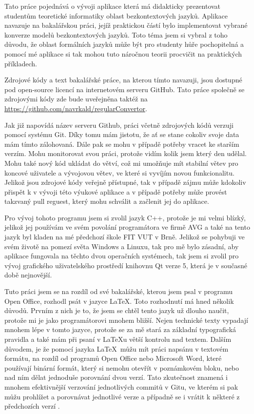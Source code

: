 
Tato práce pojednává o vývoji aplikace která má didakticky prezentovat studentům teoretické informatiky oblast bezkontextových jazyků. Aplikace navazuje na bakalářskou práci, jejíž praktickou částí bylo implementovat vybrané konverze modelů bezkontextových jazyků. Toto téma jsem si vybral z toho důvodu, že oblast formálních jazyků může být pro studenty hůře pochopitelná a pomocí mé aplikace si tak mohou tuto náročnou teorii procvičit na praktických příkladech.

Zdrojové kódy a text bakalářské práce, na kterou tímto navazuji, jsou dostupné pod open-source licencí na internetovém serveru GitHub. Tato práce společně se zdrojovými kódy zde bude uveřejněna taktéž na \url{https://github.com/navrkald/regularConvertor}.

Jak již napovídá název serveru Github, práci včetně zdrojových kódů verzuji pomocí systému Git. Díky tomu mám jistotu, že ať se stane cokoliv svoje data mám tímto zálohovaná. Dále pak se mohu v případě potřeby vracet ke starším verzím. Mohu monitorovat svou práci, protože vidím kolik jsem který den udělal. Mohu také nový kód ukládat do větví, což mi umožňuje mít stabilní větev pro koncové uživatele a vývojovou větev, ve které si vyvíjím novou funkcionalitu. Jelikož jsou zdrojové kódy veřejně přístupné, tak v případě zájmu může kdokoliv přispět k v vývoji této výukové aplikace a v případě potřeby může provést takzvaný pull reguest, který mohu schválit a začlenit jej do aplikace.

Pro vývoj tohoto programu jsem si zvolil jazyk C++, protože je mi velmi blízký, jelikož jej používám ve svém povolání programátora ve firmě AVG a také na tento jazyk byl kladen na mé předchozí škole FIT VUT v Brně. Jelikož se pohybuji ve svém životě na pomezí světa Windows a Linuxu, tak pro mě bylo zásadní, aby aplikace fungovala na těchto dvou operačních systémech, tak jsem si zvolil pro vývoj grafického uživatelského prostředí knihovnu Qt verze 5, která je v současné době nejnovější.

Tuto práci jsem se na rozdíl od své bakalářské, kterou jsem psal v programu Open Office, rozhodl psát v jazyce \LaTeX. Toto rozhodnutí má hned několik důvodů. Prvním z nich je to, že jsem se chtěl tento jazyk už dlouho naučit, protože mi je jako programátorovi mnohem bližší. Nejen technické texty vypadají mnohem lépe v tomto jazyce, protože se za mě stará za základní typografická pravidla a také mám při psaní v \LaTeX u větší kontrolu nad textem. Dalším důvodem, je že pomocí jazyka \LaTeX\ můžu mít práci napsánu v textovém formátu, na rozdíl od programů Open Office nebo Microsoft Word, které používají binární formát, který si nemohu otevřít v poznámkovém bloku, nebo nad ním dělat jednoduše porovnání dvou verzí. Tato zkutečnost znamená i mnohem efektivnější verzování jednotlivých commitů v Gitu, ve kterém si pak můžu prohlížet a porovnávat jednotlivé verze a případně se i vrátit k některé z předchozích verzí \cite{latex}.

